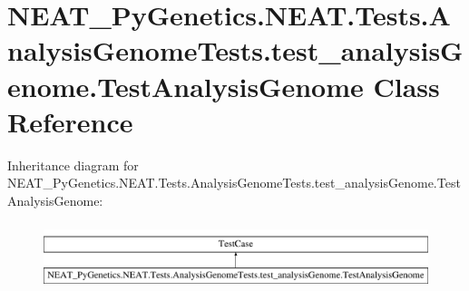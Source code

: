 \hypertarget{classNEAT__PyGenetics_1_1NEAT_1_1Tests_1_1AnalysisGenomeTests_1_1test__analysisGenome_1_1TestAnalysisGenome}{}\section{N\+E\+A\+T\+\_\+\+Py\+Genetics.\+N\+E\+A\+T.\+Tests.\+Analysis\+Genome\+Tests.\+test\+\_\+analysis\+Genome.\+Test\+Analysis\+Genome Class Reference}
\label{classNEAT__PyGenetics_1_1NEAT_1_1Tests_1_1AnalysisGenomeTests_1_1test__analysisGenome_1_1TestAnalysisGenome}
Inheritance diagram for N\+E\+A\+T\+\_\+\+Py\+Genetics.\+N\+E\+A\+T.\+Tests.\+Analysis\+Genome\+Tests.\+test\+\_\+analysis\+Genome.\+Test\+Analysis\+Genome\+:\begin{figure}[H]
\begin{center}
\leavevmode
\includegraphics[height=1.985816cm]{classNEAT__PyGenetics_1_1NEAT_1_1Tests_1_1AnalysisGenomeTests_1_1test__analysisGenome_1_1TestAnalysisGenome}
\end{center}
\end{figure}
